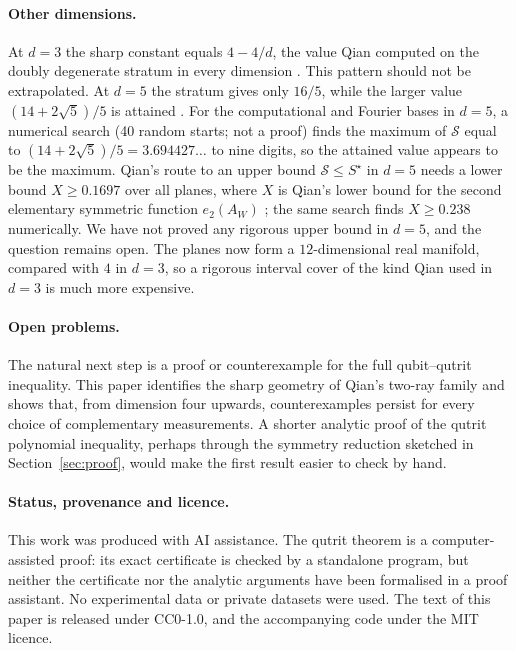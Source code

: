 \documentclass[11pt,a4paper]{article}
\numberwithin{equation}{section}
\theoremstyle{remark}\newtheorem{remark}[theorem]{Remark}
\begin{document}
\paragraph{Other dimensions.}
At $d=3$ the sharp constant equals $4-4/d$, the value Qian computed on the doubly degenerate stratum in every dimension \cite[Section~6.5]{qian}. This pattern should not be extrapolated. At $d=5$ the stratum gives only $16/5$, while the larger value $(14+2\sqrt5)/5$ is attained \cite[Sections~6.5, 6.7]{qian}.
For the computational and Fourier bases in $d=5$, a numerical search (40 random starts; not a proof) finds the maximum of $\mathcal S$ equal to $(14+2\sqrt5)/5=3.694427\ldots$ to nine digits, so the attained value appears to be the maximum. Qian's route to an upper bound $\mathcal S\le S^\star$ in $d=5$ needs a lower bound $X\ge0.1697$ over all planes, where $X$ is Qian's lower bound for the second elementary symmetric function $e_2(A_W)$ \cite[equation~(24) and Section~11(3)]{qian}; the same search finds $X\ge0.238$ numerically. We have not proved any rigorous upper bound in $d=5$, and the question remains open. The planes now form a $12$-dimensional real manifold, compared with $4$ in $d=3$, so a rigorous interval cover of the kind Qian used in $d=3$ is much more expensive.

\paragraph{Open problems.}
The natural next step is a proof or counterexample for the full qubit--qutrit inequality. This paper identifies the sharp geometry of Qian's two-ray family and shows that, from dimension four upwards, counterexamples persist for every choice of complementary measurements. A shorter analytic proof of the qutrit polynomial inequality, perhaps through the symmetry reduction sketched in Section~\ref{sec:proof}, would make the first result easier to check by hand.

\paragraph{Status, provenance and licence.}
This work was produced with AI assistance. The qutrit theorem is a computer-assisted proof: its exact certificate is checked by a standalone program, but neither the certificate nor the analytic arguments have been formalised in a proof assistant. No experimental data or private datasets were used. The text of this paper is released under CC0-1.0, and the accompanying code under the MIT licence.
\end{document}
